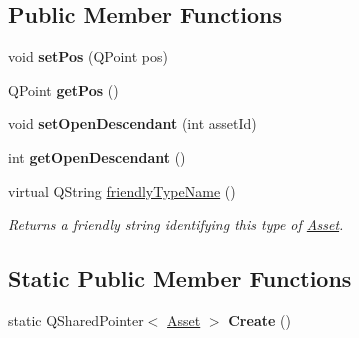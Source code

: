 \subsection*{Public Member Functions}
\begin{DoxyCompactItemize}
\item 
\hypertarget{class_picto_1_1_u_i_info_a93e2ec25cb3e0f32c2e7b620e00fa985}{void {\bfseries set\-Pos} (Q\-Point pos)}\label{class_picto_1_1_u_i_info_a93e2ec25cb3e0f32c2e7b620e00fa985}

\item 
\hypertarget{class_picto_1_1_u_i_info_ae5ceea586fcbde81ffd892733faef741}{Q\-Point {\bfseries get\-Pos} ()}\label{class_picto_1_1_u_i_info_ae5ceea586fcbde81ffd892733faef741}

\item 
\hypertarget{class_picto_1_1_u_i_info_abe14a6dc31e61ec2ae23bf9a17975773}{void {\bfseries set\-Open\-Descendant} (int asset\-Id)}\label{class_picto_1_1_u_i_info_abe14a6dc31e61ec2ae23bf9a17975773}

\item 
\hypertarget{class_picto_1_1_u_i_info_a8c70a0e62d92d4c853f118258e05e5af}{int {\bfseries get\-Open\-Descendant} ()}\label{class_picto_1_1_u_i_info_a8c70a0e62d92d4c853f118258e05e5af}

\item 
virtual Q\-String \hyperlink{class_picto_1_1_u_i_info_a44ee9f9669175ced959e5689a4d3f9ba}{friendly\-Type\-Name} ()
\begin{DoxyCompactList}\small\item\em Returns a friendly string identifying this type of \hyperlink{class_picto_1_1_asset}{Asset}. \end{DoxyCompactList}\end{DoxyCompactItemize}
\subsection*{Static Public Member Functions}
\begin{DoxyCompactItemize}
\item 
\hypertarget{class_picto_1_1_u_i_info_abbc2331acc798db78aa63739105f4d2e}{static Q\-Shared\-Pointer$<$ \hyperlink{class_picto_1_1_asset}{Asset} $>$ {\bfseries Create} ()}\label{class_picto_1_1_u_i_info_abbc2331acc798db78aa63739105f4d2e}

\end{DoxyCompactItemize}
